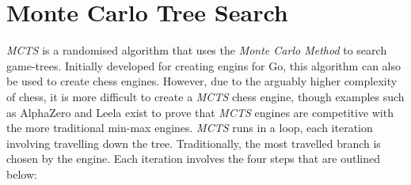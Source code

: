 \chapter{Monte Carlo Tree Search}
\textit{MCTS} is a randomised algorithm that uses the \textit{Monte Carlo Method} to search game-trees. Initially developed for creating engins for Go, this algorithm can also be used to create chess engines. However, due to the arguably higher complexity of chess, it is more difficult to create a \textit{MCTS} chess engine, though examples such as AlphaZero and Leela exist to prove that \textit{MCTS} engines are competitive with the more traditional min-max engines. 
\textit{MCTS} runs in a loop, each iteration involving travelling down the tree. Traditionally, the most travelled branch is chosen by the engine. Each iteration involves the four steps that are outlined below:
